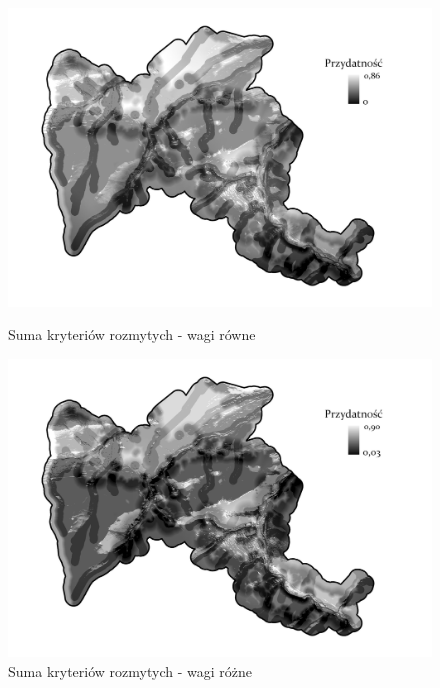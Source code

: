 \documentclass{article}
\begin{document}
\begin{figure}[H]
    \begin{minipage}[t]{0.48\textwidth}
        \centering
        \includegraphics[width=\linewidth]{img/rozmyte-layout.jpg}
        \caption{Suma kryteriów rozmytych - wagi równe}
        \label{fig:rozmyte-rowne}
    \end{minipage}
    \hfill
    \begin{minipage}[t]{0.48\textwidth}
        \centering
        \includegraphics[width=\linewidth]{img/roznewagi-rozmyte-layout.jpg}
        \caption{Suma kryteriów rozmytych - wagi różne}
        \label{fig:rozmyte-rozne}
    \end{minipage}
\end{figure}

\vspace{5pt}
\end{document}
